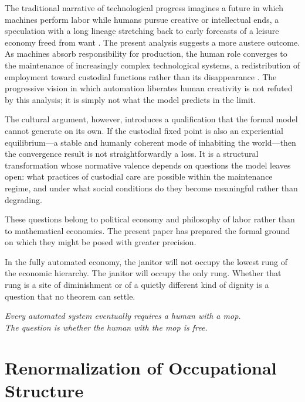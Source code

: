 \documentclass[12pt,a4paper]{article}
\theoremstyle{plain}
\theoremstyle{definition}
\theoremstyle{remark}
\begin{document}
The traditional narrative of technological progress imagines a future in which
machines perform labor while humans pursue creative or intellectual ends,
a speculation with a long lineage stretching back to early forecasts of a
leisure economy freed from want \cite{keynes1930}.  The
present analysis suggests a more austere outcome.  As machines absorb
responsibility for production, the human role converges to the maintenance of
increasingly complex technological systems, a redistribution of employment
toward custodial functions rather than its disappearance \cite{susskind2020}.  The progressive vision in which
automation liberates human creativity is not refuted by this analysis; it is
simply not what the model predicts in the limit.

The cultural argument, however, introduces a qualification that the formal
model cannot generate on its own.  If the custodial fixed point is also an
experiential equilibrium---a stable and humanly coherent mode of inhabiting the
world---then the convergence result is not straightforwardly a loss.  It is a
structural transformation whose normative valence depends on questions the
model leaves open: what practices of custodial care are possible within the
maintenance regime, and under what social conditions do they become meaningful
rather than degrading.

These questions belong to political economy and philosophy of labor rather than
to mathematical economics.  The present paper has prepared the formal ground
on which they might be posed with greater precision.

In the fully automated economy, the janitor will not occupy the lowest rung of
the economic hierarchy.  The janitor will occupy the only rung.  Whether that
rung is a site of diminishment or of a quietly different kind of dignity is a
question that no theorem can settle.

\bigskip

\begin{center}
\textit{Every automated system eventually requires a human with a mop.}\\[0.6em]
\textit{The question is whether the human with the mop is free.}
\end{center}

\appendix

\section{Renormalization of Occupational Structure}
\label{app:rg}
\end{document}
